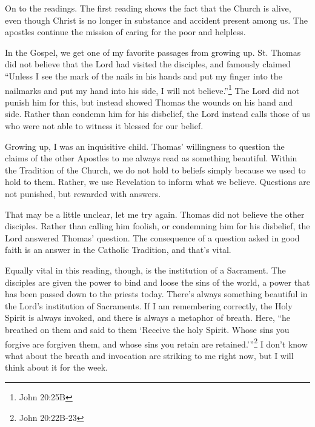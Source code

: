 \documentclass[12pt]{article}[titlepage]
\newcommand{\say}[1]{``#1''}
\newcommand{\nsay}[1]{`#1'}
\newcommand{\1}{\={a}}
\newcommand{\2}{\={e}}
\newcommand{\3}{\={\i}}
\newcommand{\4}{\=o}
\newcommand{\5}{\=u}
\newcommand{\6}{\={A}}
\renewcommand{\,}{\textsuperscript{,}}
\begin{document}
On to the readings.
The first reading shows the fact that the Church is alive, even though Christ is no longer in substance and accident present among us.
The apostles continue the mission of caring for the poor and helpless.

In the Gospel, we get one of my favorite passages from growing up.
St. Thomas did not believe that the Lord had visited the disciples, and famously claimed \say{Unless I see the mark of the nails in his hands and put my finger into the nailmarks and put my hand into his side, I will not believe.}\footnote{John 20:25B}
The Lord did not punish him for this, but instead showed Thomas the wounds on his hand and side.
Rather than condemn him for his disbelief, the Lord instead calls those of us who were not able to witness it blessed for our belief.

Growing up, I was an inquisitive child.
Thomas' willingness to question the claims of the other Apostles to me always read as something beautiful.
Within the Tradition of the Church, we do not hold to beliefs simply because we used to hold to them.
Rather, we use Revelation to inform what we believe.
Questions are not punished, but rewarded with answers.

That may be a little unclear, let me try again.
Thomas did not believe the other disciples.
Rather than calling him foolish, or condemning him for his disbelief, the Lord answered Thomas' question.
The consequence of a question asked in good faith is an answer in the Catholic Tradition, and that's vital.

Equally vital in this reading, though, is the institution of a Sacrament.
The disciples are given the power to bind and loose the sins of the world, a power that has been passed down to the priests today.
There's always something beautiful in the Lord's institution of Sacraments.
If I am remembering correctly, the Holy Spirit is always invoked, and there is always a metaphor of breath.
Here, \say{he breathed on them and said to them \nsay{Receive the holy Spirit. Whose sins you forgive are forgiven them, and whose sins you retain are retained.}}\footnote{John 20:22B-23}
I don't know what about the breath and invocation are striking to me right now, but I will think about it for the week.
\end{document}
